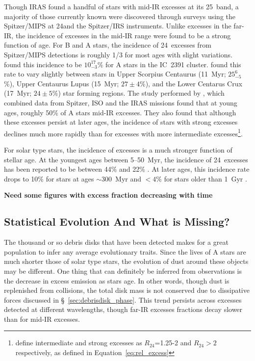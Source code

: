    Though IRAS found a handful of stars with mid-IR excesses at its 25\micron\ band, a majority of those currently known were discovered through surveys using the Spitzer/MIPS at 24\micron and the Spitzer/IRS instruments. Unlike excesses in the far-IR, the incidence of excesses in the mid-IR range were found to be a strong function of age. For B and A stars, the incidence of 24\micron\ excesses from Spitzer/MIPS detections is roughly 1/3 for most ages \citep{Wyatt2008} with slight variations. \citet{Siegler2007} found this incidence to be $10^{17}_{-3}$\% for A stars in the IC~2391 cluster. \citet{Chen2012} found this rate to vary slightly between stars in Upper Scorpius Centaurus (11~Myr; $25^{6}_{-5}$\%), Upper Centaurus Lupus (15~Myr; $27 \pm 4$\%), and the Lower Centarus Crux (17~Myr; $24 \pm 5$\%) star forming regions. The study performed by \citet{Rieke2005}, which combined data from Spitzer, ISO and the IRAS missions found that at young ages, roughly 50\% of A stars mid-IR excesses. They also found that although these excesses persist at later ages, the incidence of stars with strong excesses declines much more rapidly than for excesses with more intermediate excesses\footnote{\citet{Rieke2005} define intermediate and strong excesses as $R_{24}$=1.25-2 and $R_{24}>2$ respectively, as defined in Equation~\ref{eq:rel_excess}}.

   For solar type stars, the incidence of excesses is a much stronger function of stellar age. At the youngest ages between 5--50~Myr, the incidence of 24\micron\ excesses has been reported to be between 44\% and 22\% \citep{Siegler2007, Chen2012b}. At later ages, this incidence rate drops to 10\% for stars at ages $\sim$300~Myr \citep{Meyer2008} and $<4$\% for stars older than 1~Gyr \citep{Trilling2008}. 
   
   \textbf{Need some figures with excess fraction decreasing with time}
   
    
\subsection{Statistical Evolution And What is Missing?}
    
    The thousand or so debris disks that have been detected makes for a great population to infer any average evolutionary traits. Since the lives of A stars are much shorter those of solar type stars, the evolution of dust around these objects may be different. One thing that can definitely be inferred from observations is the decrease in excess emission as stars age. In other words, though dust is replenished from collisions, the total disk mass is not conserved due to dissipative forces discussed in \S~\ref{sec:debrisdisk_phase}. This trend persists across excesses detected at different wavelengths, though far-IR excesses fractions decay slower than for mid-IR excesses. 
    
